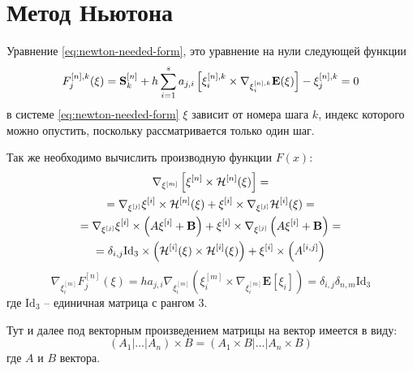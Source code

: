 \section{Метод Ньютона}

Уравнение \ref{eq:newton-needed-form}, это уравнение на нули следующей функции
\begin{equation}
    F^{[n],k}_j(\xi) = \mathbf{S}^{[n]}_k + h\sum_{i=1}^s a_{j,i} \left[ \xi_i^{[n],k}
    \times \nabla_{\xi^{[n],k}_i} \mathbf E(\xi) \right] -
    \xi^{[n],k}_j = 0
\end{equation}
в системе \ref{eq:newton-needed-form} $\xi$ зависит от номера шага $k$, индекс
которого можно опустить, поскольку рассматривается только один шаг.

Так же необходимо вычислить производную функции $F(x)$:
\begin{multline}
    \nabla_{\xi^{[m]}} \left[\xi^{[n]} \times \mathcal{H}^{[n]}(\xi)\right]
    =\\=
    \nabla_{\xi^{[j]}} \xi^{[i]} \times \mathcal{H}^{[n]}(\xi) + \xi^{[i]} \times
    \nabla_{\xi^{[j]}}\mathcal{H}^{[i]}(\xi)
    =\\=
    \nabla_{\xi^{[j]}} \xi^{[i]} \times \left(A\xi^{[i]} + \mathbf B\right) +
    \xi^{[i]} \times
    \nabla_{\xi^{[j]}}\left(A\xi^{[i]} + \mathbf B\right)
    =\\=
    \delta_{i,j} \mathrm{Id}_3
    \times \left(\mathcal{H}^{[i]}(\xi) \times \mathcal{H}^{[i]}(\xi)\right) +
    \xi^{[i]} \times \left(
    A^{[i,j]} \right)
\end{multline}
\begin{equation}
    \nabla_{\xi_i^{[m]}}F^{[n]}_j(\xi) = ha_{j,i}\nabla_{\xi_i^{[m]}}\left(
    \xi_i^{[m]} \times \nabla_{\xi_i^{[m]}}\mathbf E [\xi_i] \right) =
    \delta_{i,j}\delta_{n,m} \mathrm{Id}_3
\end{equation}
где $\mathrm{Id}_3$ -- единичная матрица с рангом 3.

\begin{remark}
    Тут и далее под векторным произведением матрицы на вектор имеется в виду:
    \begin{equation}
        (A_1|\dots|A_n) \times B = (A_1 \times B |\dots| A_n \times B)
    \end{equation}
    где $A$ и $B$ вектора.
\end{remark}
